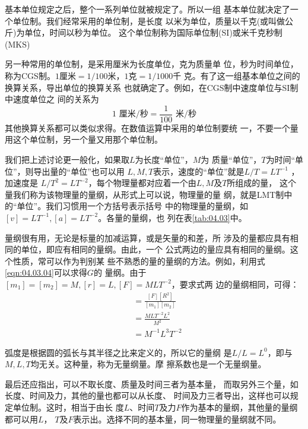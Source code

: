 \documentclass[../outline-of-mechanics.tex]{subfiles}
\begin{document}
基本单位规定之后，整个一系列单位就被规定了。所以一组
基本单位就决定了一个单位制。我们经常采用的单位制，是长度
以米为单位，质量以千克(或叫做公斤)为单位，时间以秒为单位。
这个单位制称为国际单位制(SI)或米千克秒制(MKS)

另一种常用的单位制，是采用厘米为长度单位，克为质量单
位，秒为时间单位，称为CGS制。$ 1 $厘米$ =1/100 $米，$ 1 $克$ =1/1000 $千
克。有了这一组基本单位之间的换算关系，导出单位的换算关系
也就确定了。例如，在CGS制中速度单位与SI制中速度单位之
间的关系为
\begin{equation*}
  1 \text{ 厘米/秒} = \frac { 1 } { 1 0 0 } \text{ 米/秒}
\end{equation*}
其他换算关系都可以类似求得。在数值运算中采用的单位制要统
\clearpage\noindent
一，不要一个量用这个单位制，另一个量又用那个单位制。

我们把上述讨论更一般化，如果取$ L $为长度“单位”，$ M $为
质量“单位”，$ T $为时间“单位”，则导出量的“单位”也可以用
$ L , M , T $表示，速度的“单位”就是$ L / T = L T ^ { - 1 } $ ，加速度是
$ L / T ^ { 2 } = L T ^ { - 2 } $，每个物理量都对应着一个由$ L , M $及$ T $所组成的量，
这个量我们称为该物理量的量纲，从形式上可以说，物理量的量
纲，就是LMT制中的“单位”。我们习惯用一个方括号表示括号
中的物理量的量纲，如$ [ v ] = L T ^ { - 1 } , [ a ] = L T ^ { - 2 }$。各量的量纲，也
列在表\ref{tab:04.03}中。

量纲很有用，无论是标量的加减运算，或是矢量的和差，所
涉及的量都应具有相同的单位，即应有相同的量纲。由此，一个
公式两边的量应具有相同的量纲。这个性质，常可以作为判别某
些不熟悉的量的量纲的方法。例如，利用式\eqref{eqn:04.03.04}可以求得$ G $的
量纲。由于$ [ m _ { 1 } ] = [ m _ { 2 } ] = M , [ r ] = L , [ F ] = M L T ^ { - 2 } $，要求式两
边的量纲相同，可得：
\begin{align*}
  [ G ] & = \frac { [ F ] [ R ^ 2] } { [ m _ { 1 } ] [ m _ { 2 } ] } \\
        & = \frac { M L T ^ { - 2 } L ^ { 2 } } { M ^ { 2 } }        \\
        & = M ^ { - 1 } L ^ { 3 } T ^ { - 2 }
\end{align*}

弧度是根据圆的弧长与其半径之比来定义的，所以它的量纲
是$ L / L = L ^ { 0 } $，即与$ M , L , T $均无关。这种量，称为无量纲量。摩
擦系数也是一个无量纲量。

最后还应指出，可以不取长度、质量及时间三者为基本量，
而取另外三个量，如长度、时间及力，其他的量也都可以从长度、
时间及力三者导出，这样也可以规定单位制。这时，相当于由长
度$ L $、时间$ T $及力$ F $作为基本的量纲，其他量的量纲都可以用$ L $，
$ T $及$ F $表示出。选择不同的基本量，同一物理量的量纲就不同。
\end{document}

